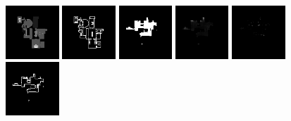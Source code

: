 \begin{figure}[h!]
\begin{minipage}[b]{\linewidth}
	\begin{center}
		\includegraphics[width=2cm]{figures/results/samples/cond/sample27_map_heightmap_true.png}
		\includegraphics[width=2cm]{figures/results/samples/cond/sample27_map_wallmap_true.png}
		\hfill 
		\includegraphics[width=2cm]{figures/results/samples/cond/sample27_map_floormap_generated.png}
		\includegraphics[width=2cm]{figures/results/samples/cond/sample27_map_heightmap_generated.png}
		\includegraphics[width=2cm]{figures/results/samples/cond/sample27_map_thingsmap_generated.png}
		\includegraphics[width=2cm]{figures/results/samples/cond/sample27_map_wallmap_generated.png}
	\end{center}
	

\end{minipage}
\end{figure}
